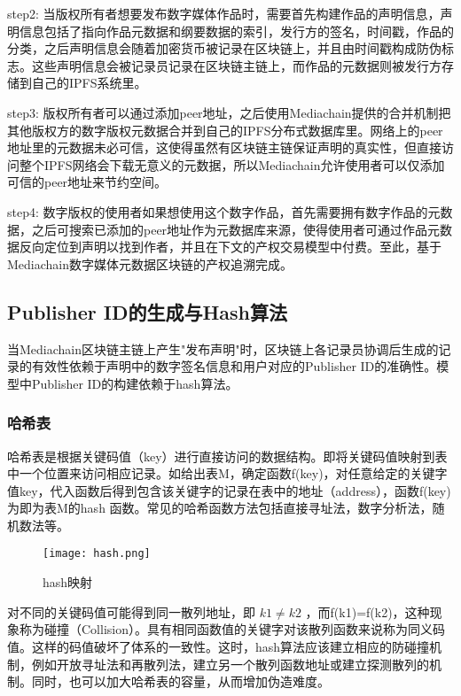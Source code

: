 \documentclass[withoutpreface,bwprint]{cumcmthesis} %
\begin{document}
step2: 当版权所有者想要发布数字媒体作品时，需要首先构建作品的声明信息，声明信息包括了指向作品元数据和纲要数据的索引，发行方的签名，时间戳，作品的分类，之后声明信息会随着加密货币被记录在区块链上，并且由时间戳构成防伪标志。这些声明信息会被记录员记录在区块链主链上，而作品的元数据则被发行方存储到自己的IPFS系统里。

step3: 版权所有者可以通过添加peer地址，之后使用Mediachain提供的合并机制把其他版权方的数字版权元数据合并到自己的IPFS分布式数据库里。网络上的peer地址里的元数据未必可信，这使得虽然有区块链主链保证声明的真实性，但直接访问整个IPFS网络会下载无意义的元数据，所以Mediachain允许使用者可以仅添加可信的peer地址来节约空间。

step4: 数字版权的使用者如果想使用这个数字作品，首先需要拥有数字作品的元数据，之后可搜索已添加的peer地址作为元数据库来源，使得使用者可通过作品元数据反向定位到声明以找到作者，并且在下文的产权交易模型中付费。至此，基于Mediachain数字媒体元数据区块链的产权追溯完成。

\subsection{Publisher ID的生成与Hash算法}
当Mediachain区块链主链上产生"发布声明"时，区块链上各记录员协调后生成的记录的有效性依赖于声明中的数字签名信息和用户对应的Publisher ID的准确性。模型中Publisher ID的构建依赖于hash算法。

\subsubsection{哈希表}

哈希表是根据关键码值（key）进行直接访问的数据结构。即将关键码值映射到表中一个位置来访问相应记录。如给出表M，确定函数f(key)，对任意给定的关键字值key，代入函数后得到包含该关键字的记录在表中的地址（address），函数f(key)为即为表M的hash 函数。常见的哈希函数方法包括直接寻址法，数字分析法，随机数法等。

\begin{figure}[!h]
	\centering
	\texttt{[image: hash.png]}
	\caption{hash映射}
\end{figure}

对不同的关键码值可能得到同一散列地址，即 $k1\neq k2$ ，而f(k1)=f(k2)，这种现象称为碰撞（Collision）。具有相同函数值的关键字对该散列函数来说称为同义码值。这样的码值破坏了体系的一致性。这时，hash算法应该建立相应的防碰撞机制，例如开放寻址法和再散列法，建立另一个散列函数地址或建立探测散列的机制。同时，也可以加大哈希表的容量，从而增加伪造难度。
\end{document}
